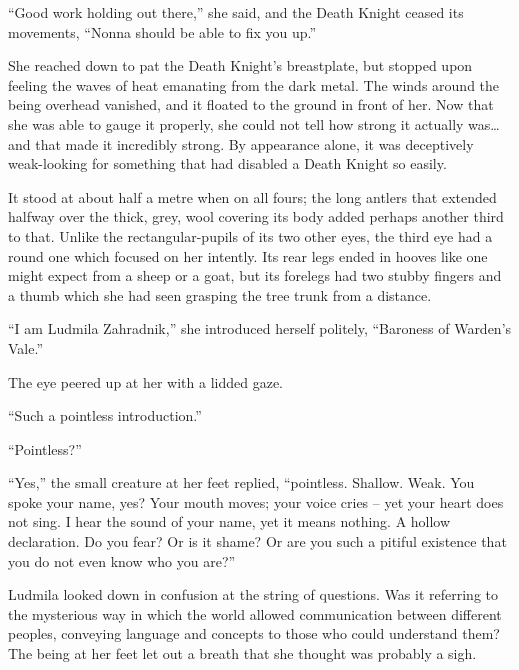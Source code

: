  

“Good work holding out there,” she said, and the Death Knight ceased its movements, “Nonna should be able to fix you up.”

 

She reached down to pat the Death Knight’s breastplate, but stopped upon feeling the waves of heat emanating from the dark metal. The winds around the being overhead vanished, and it floated to the ground in front of her. Now that she was able to gauge it properly, she could not tell how strong it actually was…and that made it incredibly strong. By appearance alone, it was deceptively weak-looking for something that had disabled a Death Knight so easily.

 

It stood at about half a metre when on all fours; the long antlers that extended halfway over the thick, grey, wool covering its body added perhaps another third to that. Unlike the rectangular-pupils of its two other eyes, the third eye had a round one which focused on her intently. Its rear legs ended in hooves like one might expect from a sheep or a goat, but its forelegs had two stubby fingers and a thumb which she had seen grasping the tree trunk from a distance.

 

“I am Ludmila Zahradnik,” she introduced herself politely, “Baroness of Warden’s Vale.”

 

The eye peered up at her with a lidded gaze.

 

“Such a pointless introduction.”

 

“Pointless?”

 

“Yes,” the small creature at her feet replied, “pointless. Shallow. Weak. You spoke your name, yes? Your mouth moves; your voice cries – yet your heart does not sing. I hear the sound of your name, yet it means nothing. A hollow declaration. Do you fear? Or is it shame? Or are you such a pitiful existence that you do not even know who you are?”

 

Ludmila looked down in confusion at the string of questions. Was it referring to the mysterious way in which the world allowed communication between different peoples, conveying language and concepts to those who could understand them? The being at her feet let out a breath that she thought was probably a sigh.

